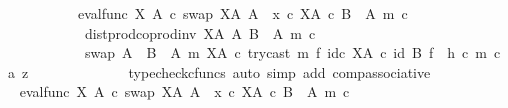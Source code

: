\begin{isabellebody}
\ \ \ \ \ \ \ \ \ \ {\isacharequal}{\kern0pt}\ {\isacharparenleft}{\kern0pt}{\isacharparenleft}{\kern0pt}eval{\isacharunderscore}{\kern0pt}func\ X\ A\ {\isasymcirc}\isactrlsub c\ swap\ {\isacharparenleft}{\kern0pt}X\isactrlbsup A\isactrlesup {\isacharparenright}{\kern0pt}\ A{\isacharparenright}{\kern0pt}\ {\isasymamalg}\ {\isacharparenleft}{\kern0pt}x\ {\isasymcirc}\isactrlsub c\ {\isasymbeta}\isactrlbsub X\isactrlbsup A\isactrlesup \ {\isasymtimes}\isactrlsub c\ {\isacharparenleft}{\kern0pt}B\ {\isasymsetminus}\ {\isacharparenleft}{\kern0pt}A{\isacharcomma}{\kern0pt}\ m{\isacharparenright}{\kern0pt}{\isacharparenright}{\kern0pt}\isactrlesub {\isacharparenright}{\kern0pt}\ {\isasymcirc}\isactrlsub c\isanewline
\ \ \ \ \ \ \ \ \ \ \ \ dist{\isacharunderscore}{\kern0pt}prod{\isacharunderscore}{\kern0pt}coprod{\isacharunderscore}{\kern0pt}inv\ {\isacharparenleft}{\kern0pt}X\isactrlbsup A\isactrlesup {\isacharparenright}{\kern0pt}\ A\ {\isacharparenleft}{\kern0pt}B\ {\isasymsetminus}\ {\isacharparenleft}{\kern0pt}A{\isacharcomma}{\kern0pt}\ m{\isacharparenright}{\kern0pt}{\isacharparenright}{\kern0pt}\ {\isasymcirc}\isactrlsub c\isanewline
\ \ \ \ \ \ \ \ \ \ \ \ swap\ {\isacharparenleft}{\kern0pt}A\ {\isasymCoprod}\ {\isacharparenleft}{\kern0pt}B\ {\isasymsetminus}\ {\isacharparenleft}{\kern0pt}A{\isacharcomma}{\kern0pt}\ m{\isacharparenright}{\kern0pt}{\isacharparenright}{\kern0pt}{\isacharparenright}{\kern0pt}\ {\isacharparenleft}{\kern0pt}X\isactrlbsup A\isactrlesup {\isacharparenright}{\kern0pt}\ {\isasymcirc}\isactrlsub c\ try{\isacharunderscore}{\kern0pt}cast\ m\ {\isasymtimes}\isactrlsub f\ id\isactrlsub c\ {\isacharparenleft}{\kern0pt}X\isactrlbsup A\isactrlesup {\isacharparenright}{\kern0pt}{\isacharparenright}{\kern0pt}\ {\isasymcirc}\isactrlsub c\ {\isacharparenleft}{\kern0pt}id\ B\ {\isasymtimes}\isactrlsub f\ \ h{\isacharparenright}{\kern0pt}\ {\isasymcirc}\isactrlsub c\ {\isasymlangle}m\ {\isasymcirc}\isactrlsub c\ a{\isacharcomma}{\kern0pt}\ z{\isasymrangle}{\isachardoublequoteclose}\isanewline
\ \ \ \ \ \ \ \ \ \ \ \ \isamarkupfalse%
\ {\isacharparenleft}{\kern0pt}typecheck{\isacharunderscore}{\kern0pt}cfuncs{\isacharcomma}{\kern0pt}\ auto\ simp\ add{\isacharcolon}{\kern0pt}\ comp{\isacharunderscore}{\kern0pt}associative{}{\isacharparenright}{\kern0pt}\isanewline
\ \ \ \ \ \ \ \ \ \ \isamarkupfalse%
\ \isamarkupfalse%
\ {\isachardoublequoteopen}{\isacharparenleft}{\kern0pt}{\isacharparenleft}{\kern0pt}eval{\isacharunderscore}{\kern0pt}func\ X\ A\ {\isasymcirc}\isactrlsub c\ swap\ {\isacharparenleft}{\kern0pt}X\isactrlbsup A\isactrlesup {\isacharparenright}{\kern0pt}\ A{\isacharparenright}{\kern0pt}\ {\isasymamalg}\ {\isacharparenleft}{\kern0pt}x\ {\isasymcirc}\isactrlsub c\ {\isasymbeta}\isactrlbsub X\isactrlbsup A\isactrlesup \ {\isasymtimes}\isactrlsub c\ {\isacharparenleft}{\kern0pt}B\ {\isasymsetminus}\ {\isacharparenleft}{\kern0pt}A{\isacharcomma}{\kern0pt}\ m{\isacharparenright}{\kern0pt}{\isacharparenright}{\kern0pt}\isactrlesub {\isacharparenright}{\kern0pt}\ {\isasymcirc}\isactrlsub c\isanewline

\end{isabellebody}
